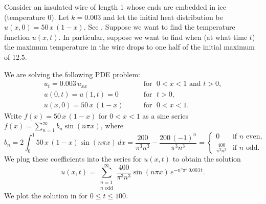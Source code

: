 \begin{example}
Consider
an insulated wire of length 1 whose
ends are embedded in ice (temperature 0).
Let $k=0.003$ and let the initial heat distribution
be $u(x,0) = 50\,x\,(1-x)$.
See .
Suppose we want to find the temperature function $u(x,t)$.
In particular, suppose we
want to find when (at what time $t$)
the maximum temperature in the wire 
drops to one half of the initial maximum of 12.5.

\begin{myfig}
\capstart
{}
\caption{Initial distribution of temperature in the
wire.\label{heat:wireexinitfig}}
\end{myfig}

We are solving the following PDE problem:
\begin{equation*}
\begin{array}{ll}
u_t = 0.003 \, u_{xx} & \qquad \text{for } \; 0 < x < 1 \text{ and } t > 0, \\
u(0,t) = u(1,t) = 0 & \qquad \text{for } \; t > 0, \\
u(x,0) = 50\,x\,(1-x) & \qquad \text{for } \; 0 < x < 1 .
\end{array}
\end{equation*}
Write $f(x) = 50\,x\,(1-x)$ for $0 < x < 1$ as a sine series
$f(x) = \sum_{n=1}^\infty b_n \sin (n \pi x)$,
where
\begin{equation*}
b_n = 2 \int_0^1 50\,x\,(1-x) \sin (n \pi x) \,dx
= 
\frac{200}{{\pi }^{3}{n}^{3}}-\frac{200\,{\left( -1\right) }^{n}}{{\pi }^{3}{n}^{3}}
=
\begin{cases}
0 & \text{if } n \text{ even} , \\
\frac{400}{\pi^3 n^3} & \text{if } n \text{ odd} .
\end{cases}
\end{equation*}
We plug these coefficients into the series for $u(x,t)$ to obtain the
solution
\begin{equation*}
u(x,t) = 
\sum_{\substack{n=1 \\ n \text{ odd}}}^\infty
\frac{400}{\pi^3 n^3}
\sin (n \pi x )
\, e^{-n^2 \pi^2 \, 0.003 \, t} .
\end{equation*}
We plot the solution
in  for $0 \leq t \leq 100$.


\end{example}
